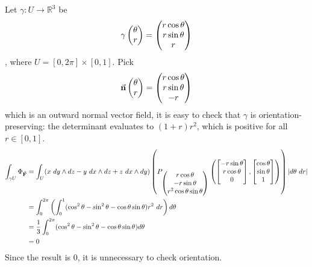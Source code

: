 \documentclass{homework}
\begin{document}
\begin{problem}{11}
  Let $\gamma: U \to \mathbb{R}^3$ be
  $$\gamma \begin{pmatrix}\theta \\ r\end{pmatrix} = \begin{pmatrix}r\cos\theta \\ r\sin\theta \\ r\end{pmatrix}$$
  , where $U = [0, 2\pi] \times [0, 1]$.
  Pick
  $$\vec{\mathbf{n}} \begin{pmatrix}\theta \\ r\end{pmatrix} = \begin{pmatrix}r\cos\theta \\ r\sin\theta \\ -r\end{pmatrix}$$
  which is an outward normal vector field, it is easy to check that $\gamma$ is
  orientation-preserving: the determinant evaluates to $(1+r)r^2$, which is
  positive for all $r \in [0, 1]$.
  \begin{align*}
    \int_{\gamma{U}} \Phi_{\bvec{F}} &=
    \int_U (x\ dy \land dz - y\ dx \land dz + z\ dx \land dy) \left(
      P_{\pmat{r\cos\theta \\ -r\sin\theta \\ r^2\cos\theta\sin\theta}}
        \left(
          \bmat{-r\sin\theta \\ r\cos\theta \\ 0},
          \bmat{  \cos\theta \\ \sin\theta  \\ 1}
        \right)
      \right) |d\theta\ dr| \\ &=
    \int_0^{2\pi} \left(
      \int_0^1 (\cos^2\theta - \sin^2\theta - \cos\theta\sin\theta)r^2\ dr
    \right) d\theta \\ &=
    \dfrac{1}{3} \int_0^{2\pi}
      (\cos^2\theta - \sin^2\theta - \cos\theta\sin\theta) d\theta \\ &=
    0
  \end{align*}
  Since the result is $0$, it is unnecessary to check orientation.
\end{problem}
\end{document}
